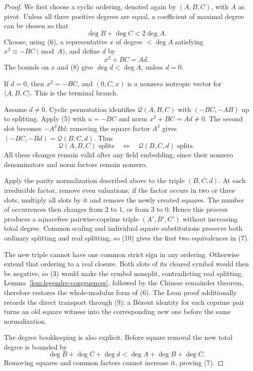 \documentclass[uplatex,dvipdfmx]{jsarticle}
\theoremstyle{definition}
\theoremstyle{remark}
\begin{document}
\begin{proof}
We first choose a cyclic ordering, denoted again by $(A,B,C)$, with $A$ as
pivot.  Unless all three positive degrees are equal, a coefficient of maximal
degree can be chosen so that
\[
  \deg B+\deg C<2\deg A.                                \tag{8}
\]
Choose, using (6), a representative $x$ of degree $<\deg A$ satisfying
$x^2\equiv-BC\pmod A$, and define $d$ by
\[
  x^2+BC=Ad.                                             \tag{9}
\]
The bounds on $x$ and (8) give $\deg d<\deg A$, unless $d=0$.

If $d=0$, then $x^2=-BC$, and $(0,C,x)$ is a nonzero isotropic
vector for $\langle A,B,C\rangle$.  This is the terminal branch.

Assume $d\ne0$.  Cyclic permutation identifies $\mathcal Q(A,B,C)$ with
$(-BC,-AB)$ up to splitting.  Apply (5) with $u=-BC$ and norm
$x^2+BC=Ad\ne0$.  The second slot becomes $-A^2Bd$; removing the square
factor $A^2$ gives $(-BC,-Bd)=\mathcal Q(B,C,d)$.  Thus
\[
  \mathcal Q(A,B,C)\text{ splits}
  \quad\Longleftrightarrow\quad
  \mathcal Q(B,C,d)\text{ splits}.                       \tag{10}
\]
All these changes remain valid after any field embedding, since their
nonzero denominators and norm factors remain nonzero.

Apply the parity normalization described above to the triple
$(B,C,d)$.  At each irreducible factor, remove even valuations; if the factor
occurs in two or three slots, multiply all slots by it and remove the newly
created squares.  The number of occurrences then changes from $2$ to $1$, or
from $3$ to $0$.  Hence this process produces a squarefree pairwise-coprime
triple $(A',B',C')$ without increasing total degree.  Common scaling and
individual square substitutions preserve both ordinary splitting and real
splitting, so (10) gives the first two equivalences in (7).

The new triple cannot have one common strict sign in any ordering.  Otherwise
extend that ordering to a real closure.  Both slots of its cleared symbol
would then be negative, so (3) would make the symbol nonsplit, contradicting
real splitting.  Lemma~\ref{lem:legendre-congruences}, followed by the Chinese
remainder theorem, therefore restores the whole-modulus form of (6).  The
Lean proof additionally records the direct transport through (9): a
Bézout identity for each coprime pair turns an old square witness into the
corresponding new one before the same normalization.

The degree bookkeeping is also explicit.  Before square removal the new total
degree is bounded by
\[
  \deg B+\deg C+\deg d
  <\deg A+\deg B+\deg C.
\]
Removing squares and common factors cannot increase it, proving (7).


\end{proof}
\end{document}
